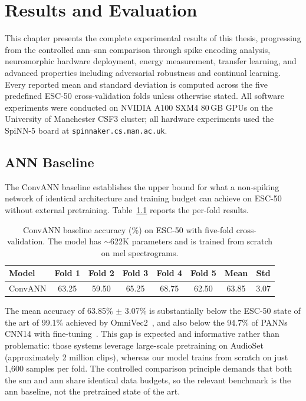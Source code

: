 \chapter{Results and Evaluation}
\label{ch:results}

This chapter presents the complete experimental results of this thesis, progressing from the controlled \gls{ann}--\gls{snn} comparison through spike encoding analysis, neuromorphic hardware deployment, energy measurement, transfer learning, and advanced properties including adversarial robustness and continual learning. Every reported mean and standard deviation is computed across the five predefined ESC-50 cross-validation folds unless otherwise stated. All software experiments were conducted on NVIDIA A100 SXM4 80\,GB GPUs on the University of Manchester CSF3 cluster; all hardware experiments used the SpiNN-5 board at \texttt{spinnaker.cs.man.ac.uk}.

\section{ANN Baseline}
\label{sec:ann-baseline}

The ConvANN baseline establishes the upper bound for what a non-spiking network of identical architecture and training budget can achieve on ESC-50 without external pretraining. Table~\ref{tab:ann-baseline} reports the per-fold results.

\begin{table}[t]
\centering
\caption{ConvANN baseline accuracy (\%) on ESC-50 with five-fold cross-validation. The model has $\sim$622K parameters and is trained from scratch on mel spectrograms.}
\label{tab:ann-baseline}
\small
\begin{tabular}{@{}lccccccc@{}}
\toprule
\textbf{Model} & \textbf{Fold 1} & \textbf{Fold 2} & \textbf{Fold 3} & \textbf{Fold 4} & \textbf{Fold 5} & \textbf{Mean} & \textbf{Std} \\
\midrule
ConvANN & 63.25 & 59.50 & 65.25 & 68.75 & 62.50 & 63.85 & 3.07 \\
\bottomrule
\end{tabular}
\end{table}

The mean accuracy of 63.85\% $\pm$ 3.07\% is substantially below the ESC-50 state of the art of 99.1\% achieved by OmniVec2~\citep{srivastava2024omnivec2}, and also below the 94.7\% of PANNs CNN14 with fine-tuning~\citep{kong2020panns}. This gap is expected and informative rather than problematic: those systems leverage large-scale pretraining on AudioSet (approximately 2 million clips), whereas our model trains from scratch on just 1,600 samples per fold. The controlled comparison principle demands that both the \gls{snn} and \gls{ann} share identical data budgets, so the relevant benchmark is the \gls{ann} baseline, not the pretrained state of the art.

